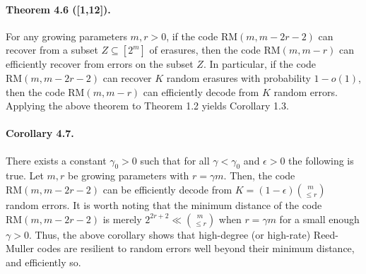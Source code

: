 \documentclass[10pt,a4paper]{article}
\begin{document}
\paragraph{Theorem 4.6 ([1,12]).} For any growing parameters $m,r>0$, if the code $\mathrm{RM}(m,m-2r-2)$ can recover from a subset $Z\subseteq[2^m]$ of erasures, then the code $\mathrm{RM}(m,m-r)$ can efficiently recover from errors on the subset $Z$. In particular, if the code $\mathrm{RM}(m,m-2r-2)$ can recover $K$ random erasures with probability $1-o(1)$, then the code $\mathrm{RM}(m,m-r)$ can efficiently decode from $K$ random errors.
Applying the above theorem to Theorem 1.2 yields Corollary 1.3.
\paragraph{Corollary 4.7.} There exists a constant $\gamma_0>0$ such that for all $\gamma<\gamma_0$ and $\epsilon>0$ the following is true. Let $m,r$ be growing parameters with $r=\gamma m$. Then, the code $\mathrm{RM}(m,m-2r-2)$ can be efficiently decode from $K=(1-\epsilon)\binom m{\le r}$ random errors.
It is worth noting that the minimum distance of the code $\mathrm{RM}(m,m-2r-2)$ is merely $2^{2r+2}\ll\binom m{\le r}$ when $r=\gamma m$ for a small enough $\gamma>0$. Thus, the above corollary shows that high-degree (or high-rate) Reed-Muller codes are resilient to random errors well beyond their minimum distance, and efficiently so.
\end{document}

